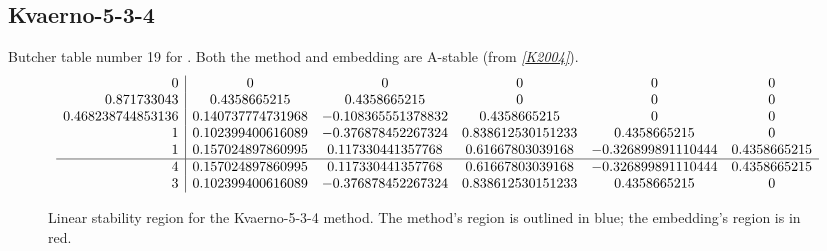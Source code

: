 \documentclass[letterpaper,10pt,english]{sphinxmanual}
\begin{document}
\subsection{Kvaerno-5-3-4}
\label{Butcher:kvaerno-5-3-4}\label{Butcher:butcher-kvaerno-5-3-4}
Butcher table number 19
for {\hyperref[c_interface/User_callable:c.ARKodeSetIRKTableNum]{\emph{}}}.  Both the
method and embedding are A-stable (from \label{Butcher:id18}{\hyperref[References:k2004]{\emph{{[}K2004{]}}}}).
\begin{gather}
\begin{split}\begin{array}{r|ccccc}
  0 & 0 & 0 & 0 & 0 & 0 \\
  0.871733043 & 0.4358665215  & 0.4358665215  & 0 & 0 & 0 \\
  0.468238744853136 & 0.140737774731968 & -0.108365551378832 & 0.4358665215 & 0 & 0 \\
  1 & 0.102399400616089 & -0.376878452267324 & 0.838612530151233 & 0.4358665215 & 0 \\
  1 & 0.157024897860995 & 0.117330441357768 & 0.61667803039168 & -0.326899891110444 & 0.4358665215 \\
  \hline
  4 & 0.157024897860995 & 0.117330441357768 & 0.61667803039168 & -0.326899891110444 & 0.4358665215 \\
  3 & 0.102399400616089 & -0.376878452267324 & 0.838612530151233 & 0.4358665215 & 0
\end{array}\end{split}\notag
\end{gather}\begin{figure}[htbp]
\centering
\capstart

\caption{Linear stability region for the Kvaerno-5-3-4 method.  The method's
region is outlined in blue; the embedding's region is in red.}\end{figure}
\end{document}
